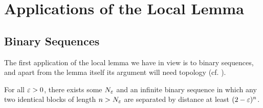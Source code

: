 \section{Applications of the Local Lemma}

\subsection{Binary Sequences}

The first application of the local lemma we have in view is to binary sequences, and apart from the lemma itself its argument will need topology (cf. ).

\begin{boxtheorem}
    For all $\varepsilon > 0$, there exists some $N_{\varepsilon}$ and an infinite binary sequence in which any two identical blocks of length $n > N_{\varepsilon}$ are separated by distance at least $(2 - \varepsilon)^n$.
\end{boxtheorem}

